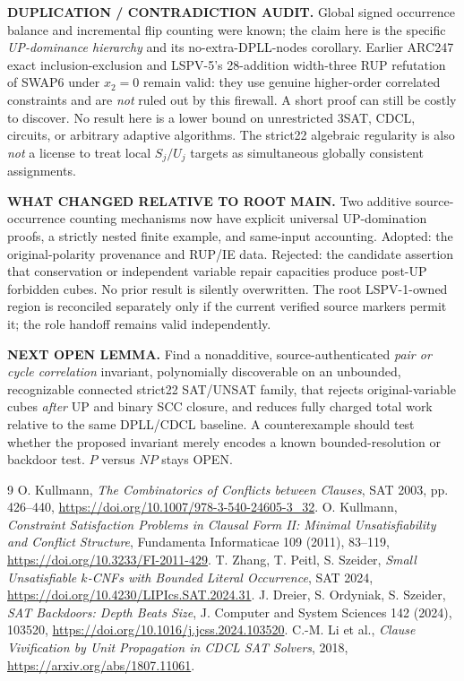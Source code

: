 \documentclass[10pt]{article}
\begin{document}
\noindent\textbf{DUPLICATION / CONTRADICTION AUDIT.} Global signed occurrence balance and incremental flip counting were known; the claim here is the specific \emph{UP-dominance hierarchy} and its no-extra-DPLL-nodes corollary. Earlier ARC247 exact inclusion-exclusion and LSPV-5's 28-addition width-three RUP refutation of SWAP6 under $x_2=0$ remain valid: they use genuine higher-order correlated constraints and are \emph{not} ruled out by this firewall. A short proof can still be costly to discover. No result here is a lower bound on unrestricted 3SAT, CDCL, circuits, or arbitrary adaptive algorithms. The strict22 algebraic regularity is also \emph{not} a license to treat local $S_j/U_j$ targets as simultaneous globally consistent assignments.

\noindent\textbf{WHAT CHANGED RELATIVE TO ROOT MAIN.} Two additive source-occurrence counting mechanisms now have explicit universal UP-domination proofs, a strictly nested finite example, and same-input accounting. Adopted: the original-polarity provenance and RUP/IE data. Rejected: the candidate assertion that conservation or independent variable repair capacities produce post-UP forbidden cubes. No prior result is silently overwritten. The root LSPV-1-owned region is reconciled separately only if the current verified source markers permit it; the role handoff remains valid independently.

\noindent\textbf{NEXT OPEN LEMMA.} Find a nonadditive, source-authenticated \emph{pair or cycle correlation} invariant, polynomially discoverable on an unbounded, recognizable connected strict22 SAT/UNSAT family, that rejects original-variable cubes \emph{after} UP and binary SCC closure, and reduces fully charged total work relative to the same DPLL/CDCL baseline. A counterexample should test whether the proposed invariant merely encodes a known bounded-resolution or backdoor test. $P$ versus $NP$ stays OPEN.

\begin{thebibliography}{9}
 O. Kullmann, \emph{The Combinatorics of Conflicts between Clauses}, SAT 2003, pp. 426--440, \url{https://doi.org/10.1007/978-3-540-24605-3_32}.
 O. Kullmann, \emph{Constraint Satisfaction Problems in Clausal Form II: Minimal Unsatisfiability and Conflict Structure}, Fundamenta Informaticae 109 (2011), 83--119, \url{https://doi.org/10.3233/FI-2011-429}.
 T. Zhang, T. Peitl, S. Szeider, \emph{Small Unsatisfiable $k$-CNFs with Bounded Literal Occurrence}, SAT 2024, \url{https://doi.org/10.4230/LIPIcs.SAT.2024.31}.
 J. Dreier, S. Ordyniak, S. Szeider, \emph{SAT Backdoors: Depth Beats Size}, J. Computer and System Sciences 142 (2024), 103520, \url{https://doi.org/10.1016/j.jcss.2024.103520}.
 C.-M. Li et al., \emph{Clause Vivification by Unit Propagation in CDCL SAT Solvers}, 2018, \url{https://arxiv.org/abs/1807.11061}.
\end{thebibliography}
\end{document}
